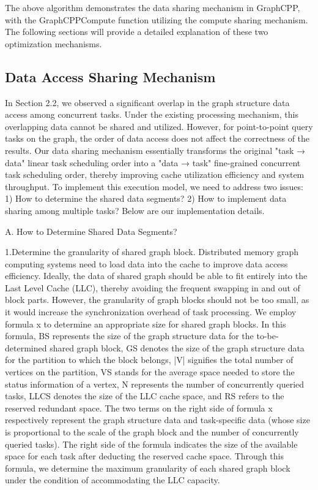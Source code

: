 \documentclass[lettersize,journal]{IEEEtran} %
\begin{document}
The above algorithm demonstrates the data sharing mechanism in GraphCPP, with the GraphCPPCompute function utilizing the compute sharing mechanism. The following sections will provide a detailed explanation of these two optimization mechanisms.

\subsection{Data Access Sharing Mechanism}
In Section 2.2, we observed a significant overlap in the graph structure data access among concurrent tasks. Under the existing processing mechanism, this overlapping data cannot be shared and utilized. However, for point-to-point query tasks on the graph, the order of data access does not affect the correctness of the results. Our data sharing mechanism essentially transforms the original "task → data" linear task scheduling order into a "data → task" fine-grained concurrent task scheduling order, thereby improving cache utilization efficiency and system throughput. To implement this execution model, we need to address two issues: 1) How to determine the shared data segments? 2) How to implement data sharing among multiple tasks? Below are our implementation details.

A. How to Determine Shared Data Segments?

1.Determine the granularity of shared graph block. Distributed memory graph computing systems need to load data into the cache to improve data access efficiency. Ideally, the data of shared graph should be able to fit entirely into the Last Level Cache (LLC), thereby avoiding the frequent swapping in and out of block parts. However, the granularity of graph blocks should not be too small, as it would increase the synchronization overhead of task processing. We employ formula x to determine an appropriate size for shared graph blocks. In this formula, BS represents the size of the graph structure data for the to-be-determined shared graph block, GS denotes the size of the graph structure data for the partition to which the block belongs, |V| signifies the total number of vertices on the partition, VS stands for the average space needed to store the status information of a vertex, N represents the number of concurrently queried tasks, LLCS denotes the size of the LLC cache space, and RS refers to the reserved redundant space. The two terms on the right side of formula x respectively represent the graph structure data and task-specific data (whose size is proportional to the scale of the graph block and the number of concurrently queried tasks). The right side of the formula indicates the size of the available space for each task after deducting the reserved cache space. Through this formula, we determine the maximum granularity of each shared graph block under the condition of accommodating the LLC capacity.
\end{document}
